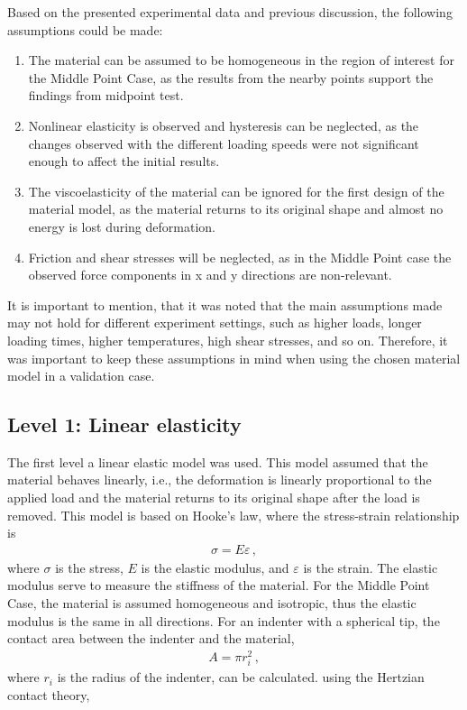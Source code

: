 Based on the presented experimental data and previous discussion, the following assumptions could be made:
\begin{enumerate}
    \item The material can be assumed to be homogeneous in the region of interest for the Middle Point Case, as the results from the nearby points support the findings from midpoint test.
    \item Nonlinear elasticity is observed and hysteresis can be neglected, as the changes observed with the different loading speeds were not significant enough to affect the initial results.
    \item The viscoelasticity of the material can be ignored for the first design of the material model, as the material returns to its original shape and almost no energy is lost during deformation. 
    \item Friction and shear stresses will be neglected, as in the Middle Point case the observed force components in x and y directions are non-relevant.
\end{enumerate}

It is important to mention, that it was noted that the main assumptions made may not hold for different 
experiment settings, such as higher loads, longer loading times, higher temperatures, high shear stresses, and so on. 
Therefore, it was important to keep these assumptions in mind when using the chosen material model in a validation case.  

\subsection{Level 1: Linear elasticity}
The first level a linear elastic model was used. This model assumed that the material behaves linearly, 
i.e., the deformation is linearly proportional to the applied load and the material returns to its original 
shape after the load is removed. This model is based on Hooke's law, where the stress-strain relationship is 
\begin{align*}
    \sigma = E\varepsilon \, ,
\end{align*}
where $\sigma$ is the stress, $E$ is the elastic modulus, and $\varepsilon$ is the strain. The elastic modulus 
serve to measure the stiffness of the material.
For the Middle Point Case, the material is assumed homogeneous and isotropic, thus the elastic modulus is the 
same in all directions. 
For an indenter with a spherical tip, the contact area between the indenter and the material, 
\begin{align*}
    A = \pi r_i^2 \, ,
\end{align*}
where $r_i$ is the radius of the indenter, can be calculated.
using the Hertzian contact theory, 


